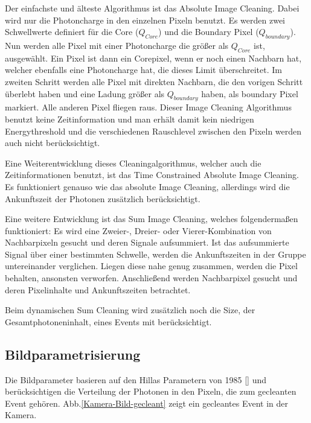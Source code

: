 Der einfachste und älteste Algorithmus ist das Absolute Image Cleaning.
Dabei wird nur die Photoncharge in den einzelnen Pixeln benutzt.
Es werden zwei Schwellwerte definiert für die Core ($Q_{Core}$) und die Boundary Pixel ($Q_{boundary}$).
Nun werden alle Pixel mit einer Photoncharge die größer als $Q_{Core}$ ist, ausgewählt.
Ein Pixel ist dann ein Corepixel, wenn er noch einen Nachbarn hat, welcher ebenfalls eine Photoncharge hat, die dieses Limit überschreitet.
Im zweiten Schritt werden alle Pixel mit direkten Nachbarn, die den vorigen Schritt überlebt haben und eine Ladung größer als $Q_{boundary}$ haben, als boundary Pixel markiert.
Alle anderen Pixel fliegen raus.
Dieser Image Cleaning Algorithmus benutzt keine Zeitinformation und man erhält damit kein niedrigen Energythreshold und die verschiedenen Rauschlevel zwischen den Pixeln werden auch nicht berücksichtigt.

Eine Weiterentwicklung dieses Cleaningalgorithmus, welcher auch die Zeitinformationen benutzt, ist das Time Constrained Absolute Image Cleaning. 
Es funktioniert genauso wie das absolute Image Cleaning, allerdings wird die Ankunftszeit der Photonen zusätzlich berücksichtigt.

Eine weitere Entwicklung ist das Sum Image Cleaning, welches folgendermaßen funktioniert:
Es wird eine Zweier-, Dreier- oder Vierer-Kombination von Nachbarpixeln gesucht und deren Signale aufsummiert.
Ist das aufsummierte Signal über einer bestimmten Schwelle, werden die Ankunftszeiten in der Gruppe untereinander verglichen. 
Liegen diese nahe genug zusammen, werden die Pixel behalten, ansonsten verworfen.
Anschließend werden Nachbarpixel gesucht und deren Pixelinhalte und Ankunftszeiten betrachtet.

Beim dynamischen Sum Cleaning wird zusätzlich noch die Size, der Gesamtphotoneninhalt, eines Events mit berücksichtigt.

\subsection{Bildparametrisierung}
Die Bildparameter basieren auf den Hillas Parametern von 1985 [] und berücksichtigen die Verteilung der Photonen in den Pixeln, die zum gecleanten Event gehören.
Abb.\ref{Kamera-Bild-gecleant} zeigt ein gecleantes Event in der Kamera.

